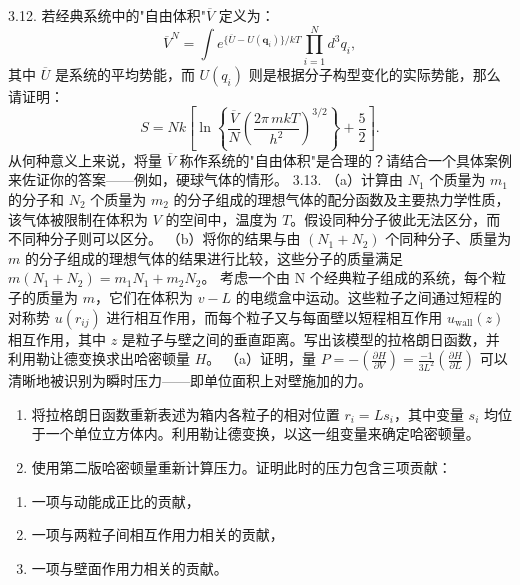 3.12. 若经典系统中的"自由体积"\(\overline{V}\) 定义为：
\begin{equation}\tag{3.5.124}\label{eq:3.5.124}
\overline { { { V } } } ^{N} = \int e ^{\{ \overline { { { U} } } - U ( \pmb { q } _ { i } ) \} / k T } \prod _ { i = 1 } ^{N} d ^{3} q _ { i } ,
\end{equation}
其中 \(\overline{U}\) 是系统的平均势能，而 \(U(q_{i})\) 则是根据分子构型变化的实际势能，那么请证明：
\begin{equation}\tag{3.5.125}\label{eq:3.5.125}
S = N k \left[ \ln \left\{ \frac { \overline { { { V } } } } { N } \left( \frac { 2 \pi \, m k T } { h ^{2} } \right) ^{3 / 2} \right\} + \frac { 5 } { 2 } \right] .
\end{equation}
从何种意义上来说，将量 \(\overline{V}\) 称作系统的"自由体积"是合理的？请结合一个具体案例来佐证你的答案——例如，硬球气体的情形。
3.13. （a）计算由 \(N_1\) 个质量为 \(m_1\) 的分子和 \(N_2\) 个质量为 \(m_2\) 的分子组成的理想气体的配分函数及主要热力学性质，该气体被限制在体积为 \(V\) 的空间中，温度为 \(T\)。假设同种分子彼此无法区分，而不同种分子则可以区分。
（b）将你的结果与由 \((N_1 + N_2)\) 个同种分子、质量为 \(m\) 的分子组成的理想气体的结果进行比较，这些分子的质量满足 \(m(N_1 + N_2) = m_1N_1 + m_2N_2\)。
考虑一个由 N 个经典粒子组成的系统，每个粒子的质量为 \(m\)，它们在体积为 \(v-L\) 的电缆盒中运动。这些粒子之间通过短程的对称势 \(u(r_{ij})\) 进行相互作用，而每个粒子又与每面壁以短程相互作用 \(u_{\mathrm{wall}}(z)\) 相互作用，其中 \(z\) 是粒子与壁之间的垂直距离。写出该模型的拉格朗日函数，并利用勒让德变换求出哈密顿量 \(H\)。
（a）证明，量 \(P=-\left(\frac{\partial H}{\partial V}\right)=\frac{-1}{3L^{2}}\left(\frac{\partial H}{\partial L}\right)\) 可以清晰地被识别为瞬时压力——即单位面积上对壁施加的力。
\begin{enumerate}
\def\labelenumi{(\alph{enumi})}
\setcounter{enumi}{1}
\item
  将拉格朗日函数重新表述为箱内各粒子的相对位置 \(r_{i}=Ls_{i}\)，其中变量 \(s_{i}\) 均位于一个单位立方体内。利用勒让德变换，以这一组变量来确定哈密顿量。
\item
  使用第二版哈密顿量重新计算压力。证明此时的压力包含三项贡献：
\end{enumerate}
\begin{enumerate}
\def\labelenumi{(\arabic{enumi})}
\item
  一项与动能成正比的贡献，
\item
  一项与两粒子间相互作用力相关的贡献，
\item
  一项与壁面作用力相关的贡献。
\end{enumerate}
